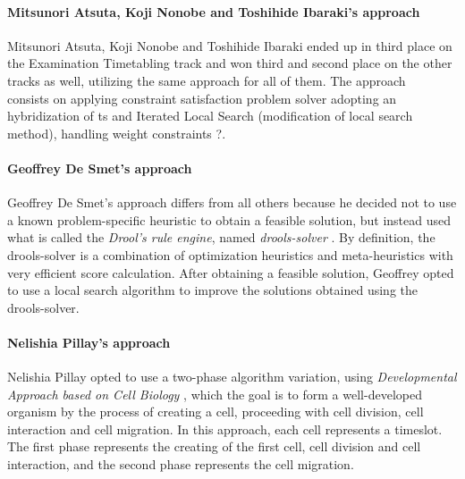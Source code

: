 \paragraph{Mitsunori Atsuta, Koji Nonobe and Toshihide Ibaraki's approach}
Mitsunori Atsuta, Koji Nonobe and Toshihide Ibaraki ended up in third place on the Examination Timetabling track and won third and second place on the other tracks as well, utilizing the same approach for all of them. The approach~\cite{Atsuta2007} consists on applying constraint satisfaction problem solver adopting an hybridization of \gls{ts} and Iterated Local Search (modification of local search method), handling weight constraints {\color{red} ?}.\\

\paragraph{Geoffrey De Smet's approach}
Geoffrey De Smet's approach \cite{Smet2007} differs from all others because he decided not to use a known problem-specific heuristic to obtain a feasible solution, but instead used what is called the \textit{Drool's rule engine}, named \textit{drools-solver} \cite{Drools}. By definition, the drools-solver is a combination of optimization heuristics and meta-heuristics with very efficient score calculation. After obtaining a feasible solution, Geoffrey opted to use a local search algorithm to improve the solutions obtained using the drools-solver.\\

\paragraph{Nelishia Pillay's approach}
Nelishia Pillay opted to use a two-phase algorithm variation, using \textit{Developmental Approach based on Cell Biology} \cite{Pillay2007}, which the goal is to form a well-developed organism by the process of creating a cell, proceeding with cell division, cell interaction and cell migration. In this approach, each cell represents a timeslot. The first phase represents the creating of the first cell, cell division and cell interaction, and the second phase represents the cell migration.



